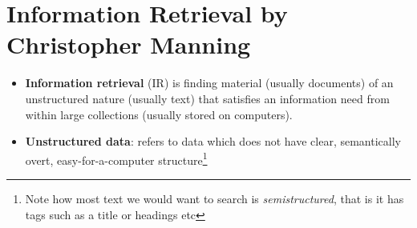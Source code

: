 \documentclass[12pt]{article}
\newcommand{\bt}[1]{\textbf{#1}}
\newcommand{\bi}[0]{  \begin{itemize}}
\newcommand{\ei}[0]{  \end{itemize}}
\newcommand{\q}[0]{\item}
\begin{document}
\section{Information Retrieval by Christopher Manning}
\bi
\q \bt{Information retrieval} (IR) is finding material (usually documents) of an unstructured nature (usually text) that satisfies an information need from within large collections (usually stored on computers).
\q \bt{Unstructured data}: refers to data which does not have clear, semantically overt, easy-for-a-computer structure\footnote{Note how most text we would want to search is \emph{semistructured}, that is it has tags such as a title or headings etc}
\ei
  
  
\end{document}
